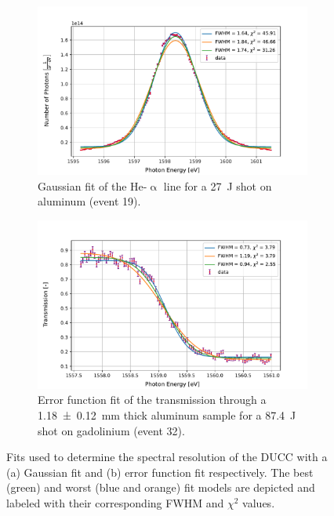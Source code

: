 \begin{figure} [H]
	\centering
	\begin{subfigure}[t]{0.9\textwidth}
		\centering
		\includegraphics[width=\textwidth]{Data_Analysis/resolution/peak_of_Al_event_19_on_DUCC.pdf}
		\caption{Gaussian fit of the He-$\upalpha$ line for a \SI{27}{\joule} shot on aluminum (event 19).}
		\label{}
	\end{subfigure}%
	\hfill
	\begin{subfigure}[t]{0.9\textwidth}
		\centering
		\includegraphics[width=\textwidth]{Data_Analysis/resolution/transmission_of_Gd_event_32_on_DUCC.pdf}
		\caption{Error function fit of the transmission through a \SI{1.18\pm0.12}{\milli\meter} thick aluminum sample for a \SI{87.4}{\joule} shot on gadolinium (event 32).}
		\label{}
	\end{subfigure}
	\caption{Fits used to determine the spectral resolution of the DUCC with a (a) Gaussian fit and (b) error function fit respectively. The best (green) and worst (blue and orange) fit models are depicted and labeled with their corresponding FWHM and $\chi^2$ values.}
	\label{}
\end{figure}


